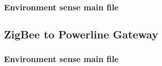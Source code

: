 \subsubsection{Environment sense main file}


\pagebreak

\subsection{ZigBee to Powerline Gateway}
\label{an:gateway-code}

\subsubsection{Environment sense main file}


\pagebreak




